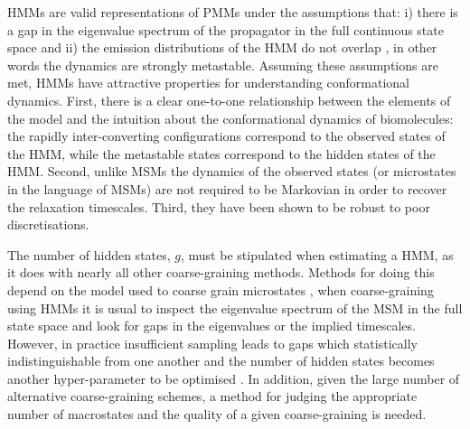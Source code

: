 HMMs are valid representations of PMMs under the assumptions that: i) there is a gap in the eigenvalue spectrum of the propagator in the full continuous state space and ii) the emission distributions of the HMM do not overlap , in other words the dynamics are strongly metastable\cite{noeProjectedHiddenMarkov2013a}. Assuming these assumptions are met, HMMs have attractive properties for understanding conformational dynamics.  First, there is a clear one-to-one relationship between the elements of the model and the intuition about the conformational dynamics of biomolecules: the rapidly inter-converting configurations correspond to the observed states of the HMM, while the metastable states correspond to the hidden states of the HMM. Second, unlike MSMs the dynamics of the observed states (or microstates in the language of MSMs) are not required to be Markovian in order to recover the relaxation timescales. Third, they have been shown to be robust to poor discretisations\cite{noeProjectedHiddenMarkov2013a}. 

The number of hidden states, $g$, must be stipulated when estimating a HMM, as it does with nearly all other coarse-graining methods. Methods for doing this depend on the model used to coarse grain microstates \cite{bowmanQuantitativeComparisonAlternative2013}, when coarse-graining using HMMs  it is usual to inspect the eigenvalue spectrum of the MSM in the full state space and look for gaps in the eigenvalues or the implied timescales\cite{noeProjectedHiddenMarkov2013a}. However, in practice insufficient sampling leads to gaps which statistically indistinguishable from one another and the number of hidden states becomes another hyper-parameter to be optimised \cite{bowmanQuantitativeComparisonAlternative2013}. In addition, given the large number of alternative coarse-graining schemes, a method for judging the appropriate number of macrostates and the quality of a given coarse-graining  is needed. 

